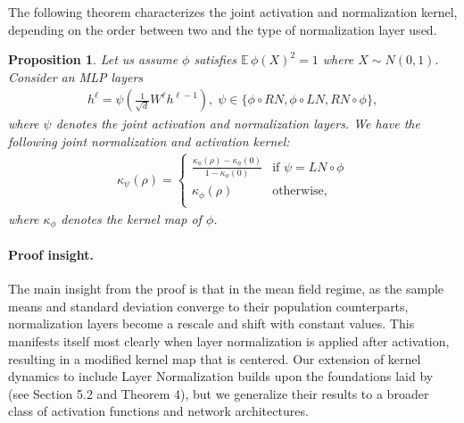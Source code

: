 \documentclass[twoside]{article}
\newcommand{\E}{\mathbb{E}\,}
\newtheorem{proposition}{Proposition}
\theoremstyle{definition}
\begin{document}
The following theorem characterizes the joint activation and normalization kernel, depending on the order between two and the type of normalization layer used. 

\begin{proposition}
\label{prop:normalization_kernel_map}
Let us assume $\phi$ satisfies $\E \phi(X)^2 = 1$ where $X\sim N(0,1).$ Consider an MLP layers 
\begin{align*}
    h^\ell = \psi\left( \frac{1}{\sqrt{d}}W^\ell h^{\ell-1}\right),
    \; \psi \in \{\phi\circ RN,\phi\circ LN, RN\circ \phi\},
\end{align*}
where $\psi$ denotes the joint activation and normalization layers. 
We have the following joint normalization and activation kernel:
\begin{align*}
    \kappa_\psi(\rho) = \begin{cases}
         \frac{\kappa_\phi(\rho)-\kappa_\phi(0)}{1-\kappa_\phi(0)} & \text{if } \psi=LN\circ \phi\\
        \kappa_\phi(\rho) & \text{otherwise},\\
    \end{cases}
\end{align*}
where $\kappa_\phi$ denotes the kernel map of $\phi$. 
\end{proposition}

\paragraph{Proof insight.} The main insight from the proof is that in the mean field regime, as the sample means and standard deviation converge to their population counterparts, normalization layers become a rescale and shift with constant values. This manifests itself most clearly when layer normalization is applied after activation, resulting in a modified kernel map that is centered. 
Our extension of kernel dynamics to include Layer Normalization builds upon the foundations laid by\citet{joudaki2023impact} (see Section 5.2 and Theorem 4), but we generalize their results to a broader class of activation functions and network architectures.
\end{document}
